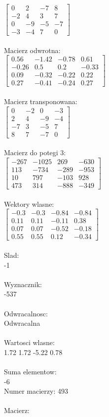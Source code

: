 \documentclass[a4paper,12pt]{article}
\begin{document}
$\begin{bmatrix} 0&2&-7&8\\-2&4&3&7\\0&-9&-5&-7\\-3&-4&7&0 \end{bmatrix}$
\\
\\
Macierz odwrotna:\\

$\begin{bmatrix} 0.56&-1.42&-0.78&0.61\\-0.26&0.5&0.2&-0.33\\0.09&-0.32&-0.22&0.22\\0.27&-0.41&-0.24&0.27 \end{bmatrix}$
\\
\\
Macierz transponowana:\\

$\begin{bmatrix} 0&-2&0&-3\\2&4&-9&-4\\-7&3&-5&7\\8&7&-7&0 \end{bmatrix}$
\\
\\
Macierz do potegi 3:\\

$\begin{bmatrix} -267&-1025&269&-630\\113&-734&-289&-953\\10&797&-103&928\\473&314&-888&-349 \end{bmatrix}$
\\
\\
Wektory wlasne:\\

$\begin{bmatrix} -0.3&-0.3&-0.84&-0.84\\0.11&0.11&-0.11&0.38\\0.07&0.07&-0.52&-0.18\\0.55&0.55&0.12&-0.34 \end{bmatrix}$
\\
\\
Slad:\\
-1
\\
\\
Wyznacznik:\\
-537
\\
\\
Odwracalnosc:\\
Odwracalna
\\
\\
Wartosci wlasne:\\
1.72 1.72 -5.22 0.78
\\
\\
Suma elementow:\\
-6
\\
\newpage
Numer macierzy:
493
\\
\\
Macierz:\\
\end{document}
